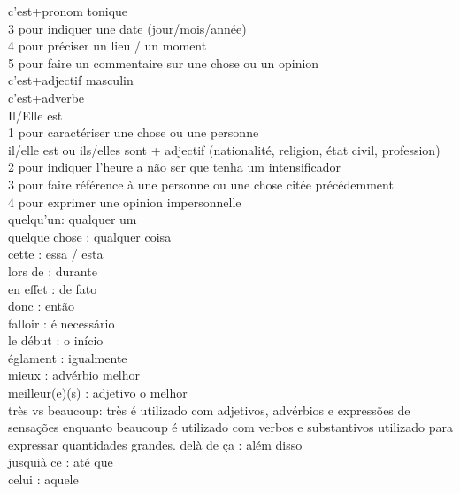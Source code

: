 \documentclass{article}
\begin{document}
          c'est+pronom tonique\\
         3 pour indiquer une date (jour/mois/année)\\
         4 pour préciser un lieu / un moment\\
         5 pour faire un commentaire sur une chose ou un opinion\\
          c'est+adjectif masculin\\
          c'est+adverbe\\
        Il/Elle est\\
         1 pour caractériser une chose ou une personne\\
          il/elle est ou ils/elles sont + adjectif (nationalité, religion, état civil, profession)\\
         2 pour indiquer l'heure a não ser que tenha um intensificador\\
         3 pour faire référence à une personne ou une chose citée précédemment\\
         4 pour exprimer une opinion impersonnelle\\
        quelqu'un: qualquer um\\
        quelque  chose      : qualquer coisa\\
                 cette      : essa / esta\\
        lors     de         : durante\\
        en       effet      : de fato\\
                 donc       : então\\
                 falloir    : é necessário\\
        le       début      : o início\\
                 églament   : igualmente\\
                 mieux      : advérbio melhor\\
        meilleur(e)(s)      : adjetivo o melhor\\
        très     vs beaucoup: très é utilizado com adjetivos, advérbios e expressões de sensações enquanto beaucoup é utilizado com verbos e substantivos utilizado para expressar quantidades grandes.
        delà     de ça      : além disso\\
        jusquià  ce         : até que\\
                 celui      : aquele\\
\end{document}
